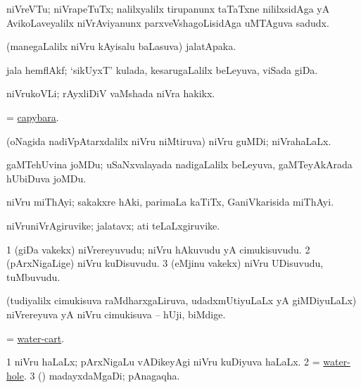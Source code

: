 \bentry
{} 
\gl{\nA}
\expl{}
\bmng
niVreVTu; niVrapeTuTx; nalilxyalilx tirupanunx taTaTxne nililxsidAga yA AvikoLaveyalilx niVrAviyanunx parxveVshagoLisidAga uMTAguva sadudx. 
\emng
\eentry

\bentry
{} 
\gl{\nA}
\expl{}
\bmng
(manegaLalilx niVru kAyisalu baLasuva) jalatApaka. 
\emng
\eentry

\bentry
{} 
\gl{\nA}
\expl{}
\bmng
jala hemflAkf; `sikUyxT' kulada, kesarugaLalilx beLeyuva, viSada giDa. 
\emng
\eentry

\bentry
{} 
\gl{\nA}
\expl{}
\bmng
niVrukoVLi; rAyxliDiV vaMshada niVra hakikx. 
\emng
\eentry

\bentry
{} 
\gl{\nA}
\bmng
= \hyperref{kandict_c.pdf}{C}{capybara}{capybara}. 
\emng
\eentry

\bentry
{} 
\gl{\nA}
\bmng
(oNagida nadiVpAtarxdalilx niVru niMtiruva) niVru guMDi; niVrahaLaLx. 
\emng
\eentry

\bentry
{} 
\gl{\nA}
\expl{}
\bmng
gaMTehUvina joMDu; uSaNxvalayada nadigaLalilx beLeyuva, gaMTeyAkArada hUbiDuva joMDu. 
\emng
\eentry

\bentry
{} 
\gl{\nA}
\expl{}
\bmng
niVru miThAyi; sakakxre hAki, parimaLa kaTiTx, GaniVkarisida miThAyi. 
\emng
\eentry

\bentry
{} 
\gl{\nA}
\expl{}
\bmng
niVruniVrAgiruvike; jalatavx; ati teLaLxgiruvike. 
\emng
\eentry

\bentry
{} 
\gl{\nA}
\expl{}
\bmng
\bnum
\num{1} (giDa \mo vakekx) niVrereyuvudu; niVru hAkuvudu yA cimukisuvudu. 
\num{2} (pArxNigaLige) niVru kuDisuvudu. 
\num{3} (eMjinu \mo vakekx) niVru UDisuvudu, tuMbuvudu. 
\enum
\emng
\eentry

\bentry
{} 
\gl{\nA}
\expl{}
\bmng
(tudiyalilx cimukisuva raMdharxgaLiruva, udadxmUtiyuLaLx yA giMDiyuLaLx) niVrereyuva yA niVru cimukisuva -- hUji, biMdige. 
\emng
\eentry

\bentry
{} 
\gl{\nA}
\expl{}
\bmng
= \hyperlink{water-cart}{water-cart}. 
\emng
\eentry

\bentry
{} 
\gl{\nA}
\expl{}
\bmng
\bnum
\num{1} niVru haLaLx; pArxNigaLu vADikeyAgi niVru kuDiyuva haLaLx. 
\num{2} = \hyperlink{water-hole}{water-hole}. 
\num{3} (\ashi) madayxdaMgaDi; pAnagaqha. 
\enum
\emng
\eentry

